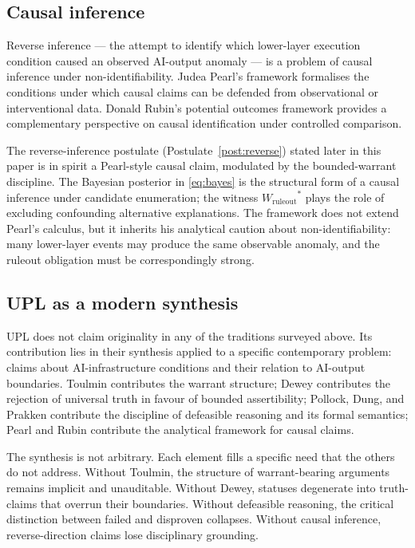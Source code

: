 \documentclass[11pt, a4paper]{article}
\theoremstyle{upldef}
\newcommand{\witness}[1]{\ensuremath{W_{\text{#1}}}}
\begin{document}
\subsection{Causal inference}
\label{sec:causal}

Reverse inference --- the attempt to identify which lower-layer
execution condition caused an observed AI-output anomaly --- is a
problem of causal inference under non-identifiability. Judea
Pearl's framework \citep{pearl2009} formalises the conditions
under which causal claims can be defended from observational or
interventional data. Donald Rubin's potential outcomes framework
\citep{rubin1974} provides a complementary perspective on causal
identification under controlled comparison.

The reverse-inference postulate (Postulate~\ref{post:reverse})
stated later in this paper is in spirit a Pearl-style causal
claim, modulated by the bounded-warrant discipline. The Bayesian
posterior in \eqref{eq:bayes} is the structural form of a causal
inference under candidate enumeration; the witness
$\witness{ruleout}^*$ plays the role of excluding confounding
alternative explanations. The framework does not extend Pearl's
calculus, but it inherits his analytical caution about
non-identifiability: many lower-layer events may produce the same
observable anomaly, and the ruleout obligation must be
correspondingly strong.

\subsection{UPL as a modern synthesis}
\label{sec:synthesis}

UPL does not claim originality in any of the traditions surveyed
above. Its contribution lies in their synthesis applied to a
specific contemporary problem: claims about AI-infrastructure
conditions and their relation to AI-output boundaries. Toulmin
contributes the warrant structure; Dewey contributes the rejection
of universal truth in favour of bounded assertibility; Pollock,
Dung, and Prakken contribute the discipline of defeasible reasoning
and its formal semantics; Pearl and Rubin contribute the analytical
framework for causal claims.

The synthesis is not arbitrary. Each element fills a specific need
that the others do not address. Without Toulmin, the structure of
warrant-bearing arguments remains implicit and unauditable.
Without Dewey, statuses degenerate into truth-claims that overrun
their boundaries. Without defeasible reasoning, the critical
distinction between failed and disproven collapses. Without causal
inference, reverse-direction claims lose disciplinary grounding.
\end{document}
